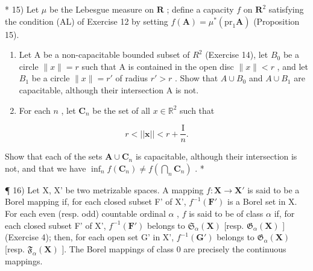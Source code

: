 * 15) Let \(\mu\) be the Lebesgue measure on \(\mathbf{R}\) ; define a capacity \(f\) on \(\mathbf{R}^2\) satisfying the condition (AL) of Exercise 12 by setting \(f(\mathbf{A}) = \mu^{*}(\mathrm{pr}_{1}\mathbf{A})\) (Proposition 15).

\begin{enumerate}
\def\labelenumi{\alph{enumi})}
\item
  Let A be a non-capacitable bounded subset of \(R^{2}\) (Exercise 14), let \(B_{0}\) be a circle \(\|x\| = r\) such that A is contained in the open disc \(\|x\| < r\) , and let \(B_{1}\) be a circle \(\|x\| = r'\) of radius \(r' > r\) . Show that \(A \cup B_{0}\) and \(A \cup B_{1}\) are capacitable, although their intersection A is not.
\item
  For each \(n\) , let \(\mathbf{C}_n\) be the set of all \(x \in \mathbb{R}^2\) such that
\end{enumerate}

\[
r <   | | \boldsymbol {x} | | <   r + \frac {\mathrm{I}}{n}.
\]

Show that each of the sets \(\mathbf{A} \cup \mathbf{C}_n\) is capacitable, although their intersection is not, and that we have \(\inf_n f(\mathbf{C}_n) \neq f\left(\bigcap_n \mathbf{C}_n\right)\) . *

¶ 16) Let X, X' be two metrizable spaces. A mapping \(f: \mathbf{X} \to \mathbf{X}'\) is said to be a Borel mapping if, for each closed subset F' of X', \(f^{-1}(\mathbf{F}')\) is a Borel set in X. For each even (resp. odd) countable ordinal \(\alpha\) , \(f\) is said to be of class \(\alpha\) if, for each closed subset F' of X', \(f^{-1}(\mathbf{F}')\) belongs to \(\mathfrak{S}_{\alpha}(\mathbf{X})\) {[}resp. \(\mathfrak{G}_{\alpha}(\mathbf{X})\) {]} (Exercise 4); then, for each open set G' in X', \(f^{-1}(\mathbf{G}')\) belongs to \(\mathfrak{G}_{\alpha}(\mathbf{X})\) {[}resp. \(\mathfrak{F}_{\alpha}(\mathbf{X})\) {]}. The Borel mappings of class 0 are precisely the continuous mappings.

